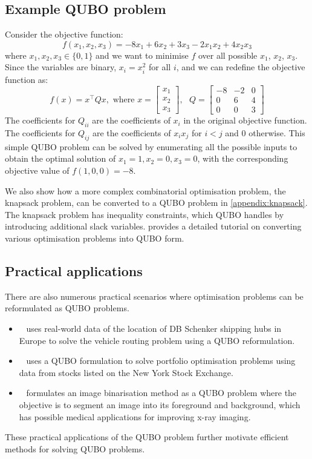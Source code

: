\subsection{Example QUBO problem}\label{subsection:example_qubo}
Consider the objective function: \begin{equation}
f(x_1, x_2, x_3) = -8x_1 + 6x_2 + 3x_3 - 2 x_1 x_2 + 4 x_2 x_3
\end{equation} where $x_1, x_2, x_3 \in \{0, 1\}$ and we want to minimise $f$ over all possible $x_1$, $x_2$, $x_3$. Since the variables are binary, $x_i = x_i^2$ for all $i$, and we can redefine the objective function as:
\begin{equation}
f(x) = x^\intercal Q x, \text{ where } x = \begin{bmatrix}
x_1 \\
x_2 \\
x_3 
\end{bmatrix}, \text{ }
Q = \begin{bmatrix}
-8 & -2 & 0\\
0 & 6 & 4\\
0 & 0 & 3
\end{bmatrix}
\end{equation}
The coefficients for $Q_{ii}$ are the coefficients of $x_i$ in the original objective function. The coefficients for $Q_{ij}$ are the coefficients of $x_{i}x_j$ for $i < j$ and $0$ otherwise. This simple QUBO problem can be solved by enumerating all the possible inputs to obtain the optimal solution of $x_1 = 1, x_2 = 0, x_3 = 0$, with the corresponding objective value of $f(1,0,0) = -8$.

We also show how a more complex combinatorial optimisation problem, the knapsack problem, can be converted to a QUBO problem in \autoref{appendix:knapsack}. The knapsack problem has inequality constraints, which QUBO handles by introducing additional slack variables.  provides a detailed tutorial on converting various optimisation problems into QUBO form. 

\subsection{Practical applications}
There are also numerous practical scenarios where optimisation problems can be reformulated as QUBO problems. 
\begin{itemize}
    \item~ uses real-world data of the location of DB Schenker shipping hubs in Europe to solve the vehicle routing problem using a QUBO reformulation.
    \item~ uses a QUBO formulation to solve portfolio optimisation problems using data from stocks listed on the New York Stock Exchange.
    \item~ formulates an image binarisation method as a QUBO problem where the objective is to segment an image into its foreground and background, which has possible medical applications for improving x-ray imaging.
\end{itemize}
These practical applications of the QUBO problem further motivate efficient methods for solving QUBO problems.

